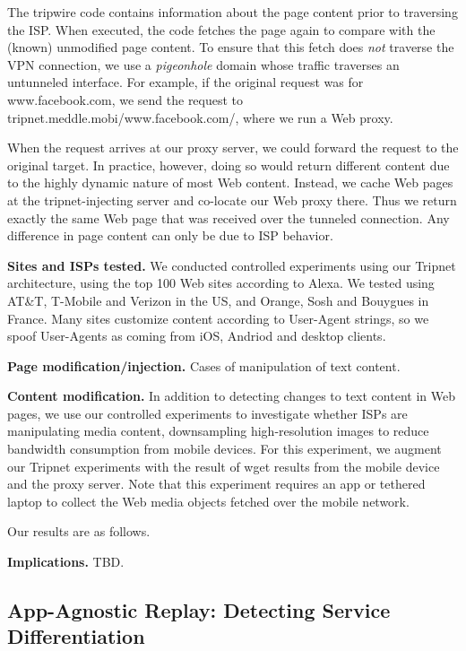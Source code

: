 The tripwire code contains information about the page content prior to traversing the ISP. When 
executed, the code fetches the page again to compare with the (known) unmodified page content.  
To ensure that this fetch does \emph{not} traverse the VPN connection, we use a \emph{pigeonhole} domain 
whose traffic traverses an untunneled interface. For example, if the original request was for www.facebook.com, 
we send the request to tripnet.meddle.mobi/www.facebook.com/, where we run a Web proxy. 

When the request arrives at our proxy server, we could forward the request to the original target. In 
practice, however, doing so would return different content due to the highly dynamic nature of most 
Web content. Instead, we cache Web pages at the tripnet-injecting server and co-locate our Web proxy 
there. Thus we return exactly the same Web page that was received over the tunneled connection. 
Any difference in page content can only be due to ISP behavior. 


\noindent\textbf{Sites and ISPs tested.} We conducted controlled experiments using our Tripnet 
architecture, using the top 100 Web sites according to Alexa. We tested using 
AT\&T, T-Mobile and Verizon in the US, and Orange, Sosh and Bouygues in France. 
Many sites customize content according to User-Agent strings, so we spoof User-Agents 
as coming from iOS, Andriod and desktop clients.

\noindent\textbf{Page modification/injection.} Cases of manipulation of text content.

\noindent\textbf{Content modification.} In addition to detecting changes to text content in 
Web pages, we use our controlled experiments to investigate whether ISPs are manipulating 
media content, \eg downsampling high-resolution images to reduce bandwidth consumption 
from mobile devices. For this experiment, we augment our Tripnet experiments with the result 
of wget results from the mobile device and the proxy server. Note that this experiment requires an 
app or tethered laptop to collect the Web media objects fetched over the mobile network.

Our results are as follows.

\noindent\textbf{Implications.} TBD.


\subsection{App-Agnostic Replay: Detecting Service Differentiation}

